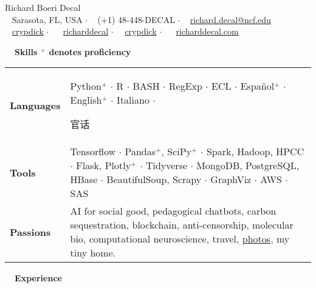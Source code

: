 \documentclass[a4paper,12pt]{article}
\newcommand{\resheading}[1]{{\vspace*{.001in} \colorbox{mygrey}{\begin{minipage}{\textwidth}{\textmd{\large \textbf{#1} \vphantom{p\^{E}}}}\end{minipage}}} }
\newcommand{\ressubheading}[4]{
        \textbf{#1} \hfill #2\\
        \textit{#3} \hfill #4 \\}
\begin{document}
\begin{center}
{\Huge Richard Boeri Decal} \\
{\small \faMapMarker~ Sarasota, FL, USA $\cdot$ \faPhone~ (+1) 48-448-DECAL $\cdot$ \faEnvelope~ \href{mailto:richard.decal@ncf.edu}{richard.decal@ncf.edu}  \\ \faGithubAlt~ \href{https://github.com/crypdick}{crypdick}   $\cdot$ ~\faLinkedin~ \href{https://www.linkedin.com/in/richarddecal/}{richarddecal}  $\cdot$~\faStackOverflow~  \href{https://stackoverflow.com/users/4212158/crypdick}{crypdick} $\cdot$  ~\faHome~  \href{http://www.richarddecal.com}{richarddecal.com}}
\end{center}

\resheading{~~Skills \hfill {\small$^+$ denotes proficiency}}
\vspace{-1em}
\begin{tabularx}{\textwidth}{p{2.1cm}>{\arraybackslash}X}
  \bfseries{Languages} & Python$^+$ $\cdot$ R  $\cdot$ BASH $\cdot$ RegExp $\cdot$ ECL $\cdot$ Espa\~nol$^+$ $\cdot$ English$^+$ $\cdot$ Italiano $\cdot$ \begin{CJK*}{UTF8}{gbsn}{官话}\end{CJK*} \\
  \bfseries{Tools} & Tensorflow  $\cdot$ Pandas$^+$, SciPy$^+$ $\cdot$ Spark, Hadoop, HPCC $\cdot$ Flask, Plotly$^+$ $\cdot$ Tidyverse $\cdot$ \mbox{MongoDB}, PostgreSQL, HBase $\cdot$ BeautifulSoup, Scrapy $\cdot$ GraphViz $\cdot$ AWS $\cdot$ SAS\\
  \bfseries{Passions} & AI for social good, pedagogical chatbots, carbon sequestration, blockchain, anti-censorship, molecular bio, computational neuroscience, travel, \href{https://www.flickr.com/photos/richarddecal/sets/72157640025469005/}{photos}, my tiny home.
\end{tabularx}


\resheading{~~Experience}
\vspace{-1em}
\end{document}
